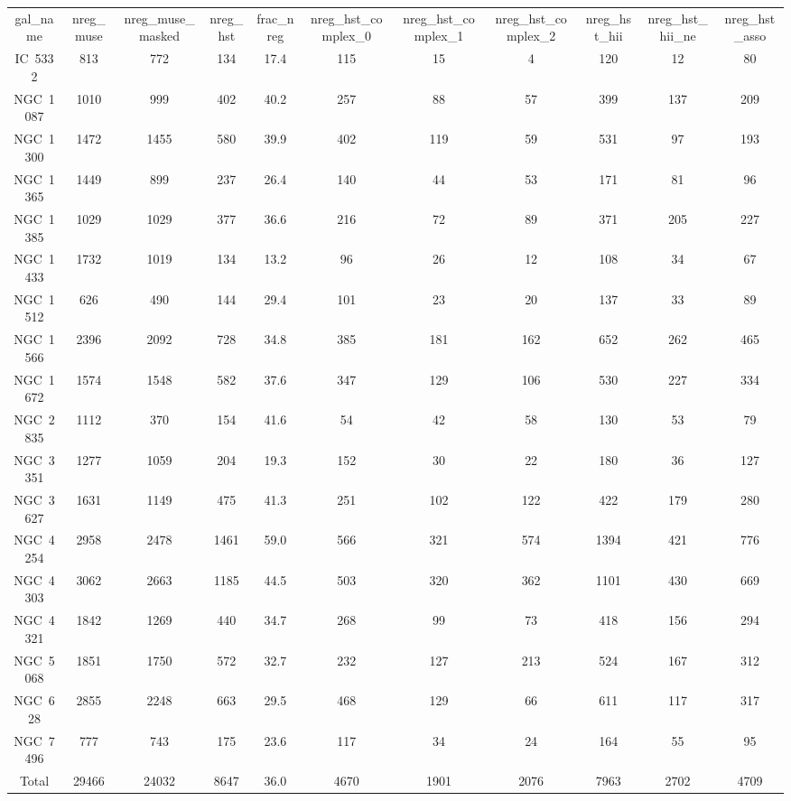 \begin{table}
\begin{tabular}{ccccccccccc}
gal_name & nreg_muse & nreg_muse_masked & nreg_hst & frac_nreg & nreg_hst_complex_0 & nreg_hst_complex_1 & nreg_hst_complex_2 & nreg_hst_hii & nreg_hst_hii_ne & nreg_hst_asso \\
IC~5332 & 813 & 772 & 134 & 17.4 & 115 & 15 & 4 & 120 & 12 & 80 \\
NGC~1087 & 1010 & 999 & 402 & 40.2 & 257 & 88 & 57 & 399 & 137 & 209 \\
NGC~1300 & 1472 & 1455 & 580 & 39.9 & 402 & 119 & 59 & 531 & 97 & 193 \\
NGC~1365 & 1449 & 899 & 237 & 26.4 & 140 & 44 & 53 & 171 & 81 & 96 \\
NGC~1385 & 1029 & 1029 & 377 & 36.6 & 216 & 72 & 89 & 371 & 205 & 227 \\
NGC~1433 & 1732 & 1019 & 134 & 13.2 & 96 & 26 & 12 & 108 & 34 & 67 \\
NGC~1512 & 626 & 490 & 144 & 29.4 & 101 & 23 & 20 & 137 & 33 & 89 \\
NGC~1566 & 2396 & 2092 & 728 & 34.8 & 385 & 181 & 162 & 652 & 262 & 465 \\
NGC~1672 & 1574 & 1548 & 582 & 37.6 & 347 & 129 & 106 & 530 & 227 & 334 \\
NGC~2835 & 1112 & 370 & 154 & 41.6 & 54 & 42 & 58 & 130 & 53 & 79 \\
NGC~3351 & 1277 & 1059 & 204 & 19.3 & 152 & 30 & 22 & 180 & 36 & 127 \\
NGC~3627 & 1631 & 1149 & 475 & 41.3 & 251 & 102 & 122 & 422 & 179 & 280 \\
NGC~4254 & 2958 & 2478 & 1461 & 59.0 & 566 & 321 & 574 & 1394 & 421 & 776 \\
NGC~4303 & 3062 & 2663 & 1185 & 44.5 & 503 & 320 & 362 & 1101 & 430 & 669 \\
NGC~4321 & 1842 & 1269 & 440 & 34.7 & 268 & 99 & 73 & 418 & 156 & 294 \\
NGC~5068 & 1851 & 1750 & 572 & 32.7 & 232 & 127 & 213 & 524 & 167 & 312 \\
NGC~628 & 2855 & 2248 & 663 & 29.5 & 468 & 129 & 66 & 611 & 117 & 317 \\
NGC~7496 & 777 & 743 & 175 & 23.6 & 117 & 34 & 24 & 164 & 55 & 95 \\
Total & 29466 & 24032 & 8647 & 36.0 & 4670 & 1901 & 2076 & 7963 & 2702 & 4709 \\
\end{tabular}
\end{table}
